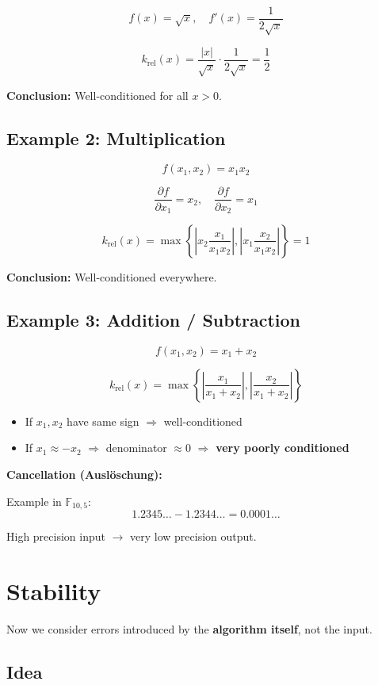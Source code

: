 \documentclass{article}
\begin{document}
\[
f(x) = \sqrt{x}, \quad f'(x) = \frac{1}{2\sqrt{x}}
\]

\[
k_{\text{rel}}(x)
=
\frac{|x|}{\sqrt{x}} \cdot \frac{1}{2\sqrt{x}}
=
\frac{1}{2}
\]

\textbf{Conclusion:} Well-conditioned for all $x > 0$.

\subsection{Example 2: Multiplication}

\[
f(x_1, x_2) = x_1 x_2
\]

\[
\frac{\partial f}{\partial x_1} = x_2, \quad
\frac{\partial f}{\partial x_2} = x_1
\]

\[
k_{\text{rel}}(x)
=
\max
\left\{
\left|x_2 \frac{x_1}{x_1 x_2}\right|,
\left|x_1 \frac{x_2}{x_1 x_2}\right|
\right\}
=
1
\]

\textbf{Conclusion:} Well-conditioned everywhere.

\subsection{Example 3: Addition / Subtraction}

\[
f(x_1, x_2) = x_1 + x_2
\]

\[
k_{\text{rel}}(x)
=
\max
\left\{
\left|\frac{x_1}{x_1 + x_2}\right|,
\left|\frac{x_2}{x_1 + x_2}\right|
\right\}
\]

\begin{itemize}
  \item If $x_1, x_2$ have same sign $\Rightarrow$ well-conditioned
  \item If $x_1 \approx -x_2$ $\Rightarrow$ denominator $\approx 0$ $\Rightarrow$ \textbf{very poorly conditioned}
\end{itemize}

\textbf{Cancellation (Auslöschung):}

Example in $\mathbb{F}_{10,5}$:
\[
1.2345\ldots - 1.2344\ldots = 0.0001\ldots
\]

High precision input $\rightarrow$ very low precision output.

\section{Stability}
\label{sec:stability}

Now we consider errors introduced by the \textbf{algorithm itself}, not the input.

\subsection{Idea}
\end{document}
